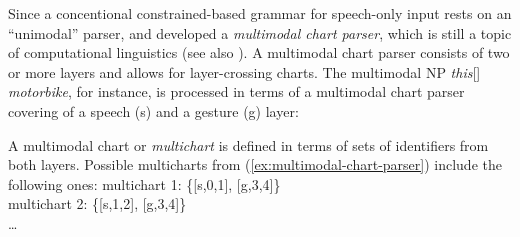 \documentclass[output=paper]{langsci/langscibook}
\begin{document}
Since a concentional constrained-based grammar for speech-only input rests on an \enquote{unimodal} parser, \citet{Johnston:1998} and \citet{Johnston:et:al:1997} developed a \emph{multimodal chart parser}, which is still a topic of computational linguistics \citep{Alahverdzhieva:Flickinger:Lascarides:2012} (see also ).
%
A multimodal chart parser consists of two or more layers and allows for layer-crossing charts.
%
The multimodal NP \emph{this}[\Pointing] \emph{motorbike}, for instance, is processed in terms of a multimodal chart parser covering of a speech (s) and a gesture (g) layer:
%
\ea \label{ex:multimodal-chart-parser}
\z

A multimodal chart or \emph{multichart}  is defined in terms of sets of identifiers from both layers.
%
Possible multicharts from (\ref{ex:multimodal-chart-parser}) include the following ones:
%
\ea
multichart 1: \{[s,0,1], [g,3,4]\} \\
multichart 2: \{[s,1,2], [g,3,4]\} \\
\ldots
\z
{}

\end{document}
